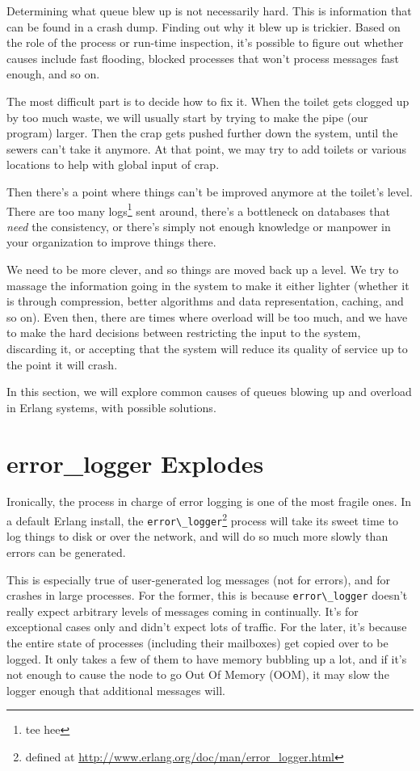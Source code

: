 \documentclass[11pt, oneside]{book}   	%
\newcommand{\module}[1]{\Verb`#1`}
\begin{document}
Determining what queue blew up is not necessarily hard. This is information that can be found in a crash dump. Finding out why it blew up is trickier. Based on the role of the process or run-time inspection, it's possible to figure out whether causes include fast flooding, blocked processes that won't process messages fast enough, and so on.

The most difficult part is to decide how to fix it. When the toilet gets clogged up by too much waste, we will usually start by trying to make the pipe (our program) larger. Then the crap gets pushed further down the system, until the sewers can't take it anymore. At that point, we may try to add toilets or various locations to help with global input of crap.

Then there's a point where things can't be improved anymore at the toilet's level. There are too many logs\footnote{tee hee} sent around, there's a bottleneck on databases that \emph{need} the consistency, or there's simply not enough knowledge or manpower in your organization to improve things there.

We need to be more clever, and so things are moved back up a level. We try to massage the information going in the system to make it either lighter (whether it is through compression, better algorithms and data representation, caching, and so on). Even then, there are times where overload will be too much, and we have to make the hard decisions between restricting the input to the system, discarding it, or accepting that the system will reduce its quality of service up to the point it will crash.

In this section, we will explore common causes of queues blowing up and overload in Erlang systems, with possible solutions.

\section{error\_logger Explodes}

Ironically, the process in charge of error logging is one of the most fragile ones. In a default Erlang install, the \module{error\_logger}\footnote{defined at \href{http://www.erlang.org/doc/man/error\_logger.html}{http://www.erlang.org/doc/man/error\_logger.html}} process will take its sweet time to log things to disk or over the network, and will do so much more slowly than errors can be generated.

This is especially true of user-generated log messages (not for errors), and for crashes in large processes. For the former, this is because \module{error\_logger} doesn't really expect arbitrary levels of messages coming in continually. It's for exceptional cases only and didn't expect lots of traffic. For the later, it's because the entire state of processes (including their mailboxes) get copied over to be logged. It only takes a few of them to have memory bubbling up a lot, and if it's not enough to cause the node to go Out Of Memory (OOM), it may slow the logger enough that additional messages will.
\end{document}
